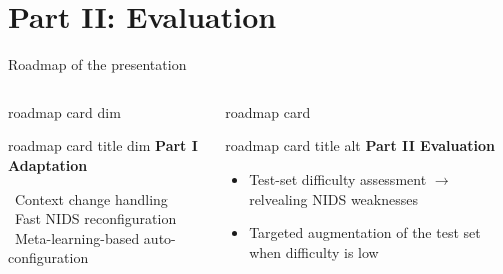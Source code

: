 \section{Part II: Evaluation}

\begin{frame}{Roadmap of the presentation}
	\small


	\centering
	\vspace*{0.2em}

	\begin{columns}[T,onlytextwidth]
		\begin{beamercolorbox}[wd=\linewidth,sep=0pt,rounded=true]{roadmap card dim}
			\begin{beamercolorbox}[wd=\linewidth,sep=1ex,rounded=true]{roadmap card title dim}
				\centering \textbf{Part I \quad Adaptation}
			\end{beamercolorbox}
			\begin{minipage}[t][4.2cm][t]{\linewidth}
				\vspace*{0.05cm}
				\raggedright
				\hspace*{0.03\linewidth}\parbox{0.94\linewidth}{%
					\footnotesize\color{black!35}
					\textbullet\ Context change handling\\[0.45em]
					\textbullet\ Fast NIDS reconfiguration\\[0.45em]
					\textbullet\ Meta-learning-based auto-configuration}
			\end{minipage}
		\end{beamercolorbox}

		\begin{beamercolorbox}[wd=\linewidth,sep=0pt,rounded=true]{roadmap card}
			\begin{beamercolorbox}[wd=\linewidth,sep=1ex,rounded=true]{roadmap card title alt}
				\centering \textbf{Part II \quad Evaluation}
			\end{beamercolorbox}
			\begin{minipage}[t][4.2cm][t]{\linewidth}
				\vspace*{0.05cm}
				\raggedright
				\hspace*{0.03\linewidth}\parbox{0.94\linewidth}{%
					\footnotesize
					\begin{itemize}
						\setlength\itemsep{0.45em}
						\item Test-set difficulty assessment \(\rightarrow\) relvealing NIDS weaknesses
						\item Targeted augmentation of the test set when difficulty is low
					\end{itemize}}
			\end{minipage}
		\end{beamercolorbox}
	\end{columns}


\end{frame}
